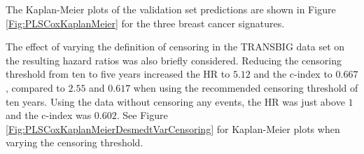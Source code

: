 \documentclass[letterpaper,12pt]{article}
\begin{document}
The Kaplan-Meier plots of the validation set predictions are shown in Figure \ref{Fig:PLSCoxKaplanMeier} for the three breast cancer signatures.

The effect of varying the definition of censoring in the TRANSBIG data set on the resulting hazard ratios was also briefly considered. Reducing the censoring threshold from ten to five years increased the HR to $5.12$ and the c-index to $0.667$, compared to $2.55$ and $0.617$ when using the recommended censoring threshold of ten years. Using the data without censoring any events, the HR was just above $1$ and the c-index was $0.602$. See Figure \ref{Fig:PLSCoxKaplanMeierDesmedtVarCensoring} for Kaplan-Meier plots when varying the censoring threshold.

%
%
\begin{figure}[!th]
\centering
{}
\end{figure}
\end{document}

